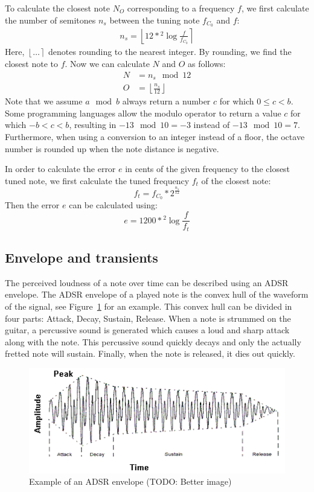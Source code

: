 \documentclass[10pt,twocolumn]{article}
\newcommand{\floor}[1]{\left \lfloor #1 \right \rfloor}
\newcommand{\round}[1]{\left \lfloor #1 \right \rceil}
\begin{document}
To calculate the closest note $N_O$ corresponding to a frequency $f$, we first calculate the number of semitones $n_s$ between the tuning note $f_{C_0}$ and $f$:
\begin{align*}
    n_s = \round{12 * {}^{2}\!\log{\frac{f}{f_{C_0}}}}
\end{align*}
Here, $\round{\ldots}$ denotes rounding to the nearest integer. By rounding, we find the closest note to $f$. Now we can calculate $N$ and $O$ as follows:
\begin{align*}
    N &= n_s \mod 12 \\
    O &= \floor{\frac{n_s}{12}}
\end{align*}
Note that we assume $a \mod b$ always return a number $c$ for which $0 \leq c < b$. Some programming languages allow the modulo operator to return a value $c$ for which $-b < c < b$, resulting in $-13 \mod 10 = -3$ instead of $-13 \mod 10 = 7$. Furthermore, when using a conversion to an integer instead of a floor, the octave number is rounded up when the note distance is negative.

In order to calculate the error $e$ in cents of the given frequency to the closest tuned note, we first calculate the tuned frequency $f_t$ of the closest note:
\[ f_t = f_{C_0} * 2^{\frac{n_s}{12}} \]
Then the error $e$ can be calculated using:
\[ e = 1200 * {}^{2}\!\log{\frac{f}{f_t}} \]

\subsection{Envelope and transients}
The perceived loudness of a note over time can be described using an ADSR envelope. The ADSR envelope of a played note is the convex hull of the waveform of the signal, see Figure~\ref{fig:adsr} for an example. This convex hull can be divided in four parts: Attack, Decay, Sustain, Release. When a note is strummed on the guitar, a percussive sound is generated which causes a loud and sharp attack along with the note. This percussive sound quickly decays and only the actually fretted note will sustain. Finally, when the note is released, it dies out quickly.
\begin{figure}[H]
    \centering
    \includegraphics[width=\linewidth]{fig/envelope.png}
    \caption{Example of an ADSR envelope (TODO: Better image)}
    \label{fig:adsr}
\end{figure}
\end{document}
